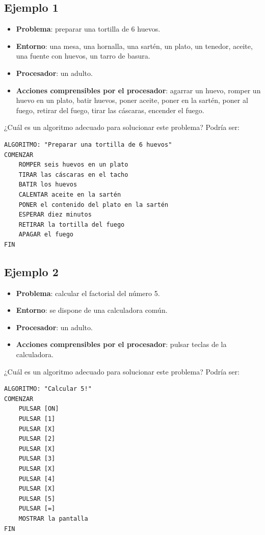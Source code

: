 \documentclass[]{book}
\providecommand{\tightlist}{%
  \setlength{\itemsep}{0pt}\setlength{\parskip}{0pt}}
\begin{document}
\hypertarget{ejemplo-1}{%
\subsection{Ejemplo 1}\label{ejemplo-1}}

\begin{itemize}
\tightlist
\item
  \textbf{Problema}: preparar una tortilla de 6 huevos.
\item
  \textbf{Entorno}: una mesa, una hornalla, una sartén, un plato, un tenedor, aceite, una fuente con huevos, un tarro de basura.
\item
  \textbf{Procesador}: un adulto.
\item
  \textbf{Acciones comprensibles por el procesador}: agarrar un huevo, romper un huevo en un plato, batir huevos, poner aceite, poner en la sartén, poner al fuego, retirar del fuego, tirar las cáscaras, encender el fuego.
\end{itemize}

¿Cuál es un algoritmo adecuado para solucionar este problema? Podría ser:

\begin{verbatim}
ALGORITMO: "Preparar una tortilla de 6 huevos"
COMENZAR
    ROMPER seis huevos en un plato
    TIRAR las cáscaras en el tacho
    BATIR los huevos
    CALENTAR aceite en la sartén
    PONER el contenido del plato en la sartén
    ESPERAR diez minutos
    RETIRAR la tortilla del fuego
    APAGAR el fuego
FIN
\end{verbatim}

\hypertarget{ejemplo-2}{%
\subsection{Ejemplo 2}\label{ejemplo-2}}

\begin{itemize}
\tightlist
\item
  \textbf{Problema}: calcular el factorial del número 5.
\item
  \textbf{Entorno}: se dispone de una calculadora común.
\item
  \textbf{Procesador}: un adulto.
\item
  \textbf{Acciones comprensibles por el procesador}: pulsar teclas de la calculadora.
\end{itemize}

¿Cuál es un algoritmo adecuado para solucionar este problema? Podría ser:

\begin{verbatim}
ALGORITMO: "Calcular 5!"
COMENZAR
    PULSAR [ON]
    PULSAR [1]
    PULSAR [X]
    PULSAR [2]
    PULSAR [X]
    PULSAR [3]
    PULSAR [X]
    PULSAR [4]
    PULSAR [X]
    PULSAR [5]
    PULSAR [=]
    MOSTRAR la pantalla
FIN
\end{verbatim}
\end{document}

